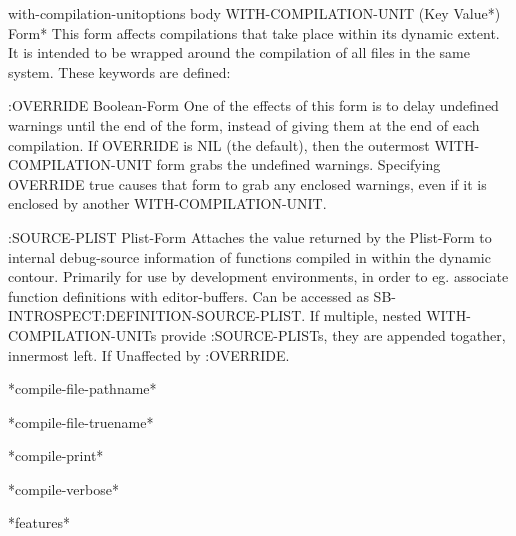 \begin{macro}{with-compilation-unit}{options \body body}{}{}
  WITH-COMPILATION-UNIT ({Key Value}*) Form*
  This form affects compilations that take place within its dynamic extent. It
  is intended to be wrapped around the compilation of all files in the same
  system. These keywords are defined:

    :OVERRIDE Boolean-Form
        One of the effects of this form is to delay undefined warnings
        until the end of the form, instead of giving them at the end of each
        compilation. If OVERRIDE is NIL (the default), then the outermost
        WITH-COMPILATION-UNIT form grabs the undefined warnings. Specifying
        OVERRIDE true causes that form to grab any enclosed warnings, even if
        it is enclosed by another WITH-COMPILATION-UNIT.

    :SOURCE-PLIST Plist-Form
        Attaches the value returned by the Plist-Form to internal debug-source
        information of functions compiled in within the dynamic contour.
        Primarily for use by development environments, in order to eg. associate
        function definitions with editor-buffers. Can be accessed as
        SB-INTROSPECT:DEFINITION-SOURCE-PLIST. If multiple, nested
        WITH-COMPILATION-UNITs provide :SOURCE-PLISTs, they are appended
        togather, innermost left. If  Unaffected by :OVERRIDE.
\end{macro}

\begin{variable}{*compile-file-pathname*}{}{}{}
  
\end{variable}

\begin{variable}{*compile-file-truename*}{}{}{}
  
\end{variable}

\begin{variable}{*compile-print*}{}{}{}
  
\end{variable}

\begin{variable}{*compile-verbose*}{}{}{}
  
\end{variable}

\begin{variable}{*features*}{}{}{}
  
\end{variable}

